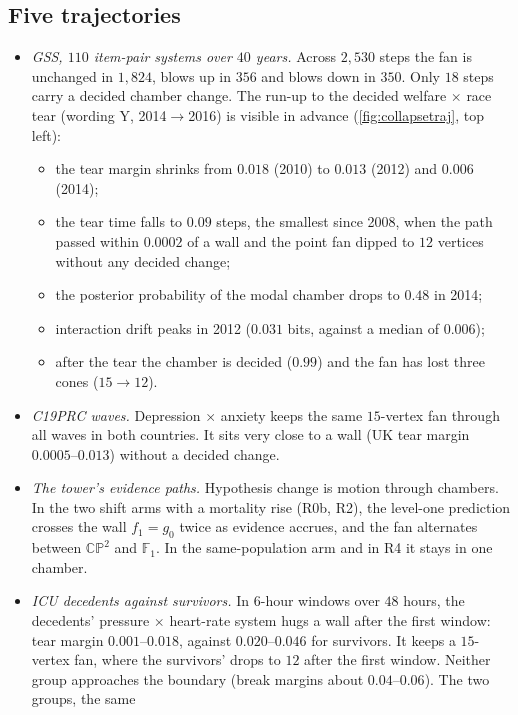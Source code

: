 \documentclass[11pt]{article}
\theoremstyle{definition}
\theoremstyle{remark}
\begin{document}
\subsection{Five trajectories}
\begin{itemize}[leftmargin=*,nosep]
\item \emph{GSS, $110$ item-pair systems over $40$ years.} Across $2{,}530$ steps the fan is unchanged in $1{,}824$, blows up in $356$ and
  blows down in $350$. Only $18$ steps carry a decided chamber change. The run-up to the decided welfare $\times$ race tear (wording Y,
  2014$\to$2016) is visible in advance (\cref{fig:collapsetraj}, top left):
  \begin{itemize}[nosep]
  \item the tear margin shrinks from $0.018$ (2010) to $0.013$ (2012) and $0.006$ (2014);
  \item the tear time falls to $0.09$ steps, the smallest since 2008, when the path passed within $0.0002$ of a wall and the point fan dipped to $12$ vertices without any decided change;
  \item the posterior probability of the modal chamber drops to $0.48$ in 2014;
  \item interaction drift peaks in 2012 ($0.031$ bits, against a median of $0.006$);
  \item after the tear the chamber is decided ($0.99$) and the fan has lost three cones ($15\to12$).
  \end{itemize}
\item \emph{C19PRC waves.} Depression $\times$ anxiety keeps the same $15$-vertex fan through all waves in both countries. It sits very
  close to a wall (UK tear margin $0.0005$--$0.013$) without a decided change.
\item \emph{The tower's evidence paths.} Hypothesis change is motion through chambers. In the two shift arms with a mortality rise
  (R0b, R2), the level-one prediction crosses the wall $f_1=g_0$ twice as evidence accrues, and the fan alternates between
  $\mathbb{CP}^2$ and $\mathbb F_1$. In the same-population arm and in R4 it stays in one chamber.
\item \emph{ICU decedents against survivors.} In $6$-hour windows over $48$ hours, the decedents' pressure $\times$ heart-rate system
  hugs a wall after the first window: tear margin $0.001$--$0.018$, against $0.020$--$0.046$ for survivors. It keeps a $15$-vertex fan,
  where the survivors' drops to $12$ after the first window. Neither group approaches the boundary (break margins about $0.04$--$0.06$). The two groups, the same

\end{itemize}
\end{document}
